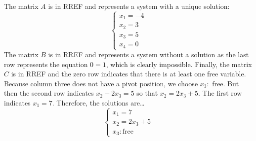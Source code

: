 \documentclass[11pt,letterpaper]{article}
\begin{document}
\sol The matrix $A$ is in RREF and represents a system with a unique solution: 
	\[
	\begin{cases}
	x_1= -4 \\
	x_2= 3 \\
	x_3= 5 \\
	x_4= 0 
	\end{cases}
	\]
The matrix $B$ is in RREF and represents a system without a solution as the last row represents the equation $0= 1$, which is clearly impossible. Finally, the matrix $C$ is in RREF and the zero row indicates that there is at least one free variable. Because column three does not have a pivot position, we choose $x_3:$ free. But then the second row indicates $x_2 - 2x_3= 5$ so that $x_2= 2x_3 + 5$. The first row indicates $x_1= 7$. Therefore, the solutions are\dots
	\[
	\begin{cases}
	x_1= 7 \\
	x_2= 2x_3 + 5 \\
	x_3: \text{free}
	\end{cases}
	\]
\end{document}
